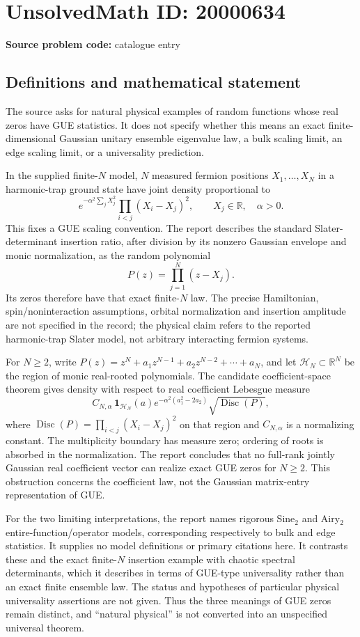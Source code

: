 \documentclass[11pt]{article}
\newcommand{\R}{\mathbb{R}}
\begin{document}
\section*{UnsolvedMath ID: 20000634}
\textbf{Source problem code:} catalogue entry
\subsection{Definitions and mathematical statement}
The source asks for natural physical examples of random functions whose real zeros have GUE statistics. It does not specify whether this means an exact finite-dimensional Gaussian unitary ensemble eigenvalue law, a bulk scaling limit, an edge scaling limit, or a universality prediction.

In the supplied finite-\(N\) model, \(N\) measured fermion positions \(X_1,\ldots,X_N\) in a harmonic-trap ground state have joint density proportional to
\[
 e^{-\alpha^2\sum_jX_j^2}\prod_{i<j}(X_i-X_j)^2,
 \qquad X_j\in\R,\quad\alpha>0.
\]
This fixes a GUE scaling convention. The report describes the standard Slater-determinant insertion ratio, after division by its nonzero Gaussian envelope and monic normalization, as the random polynomial
\[
 P(z)=\prod_{j=1}^N(z-X_j).
\]
Its zeros therefore have that exact finite-\(N\) law. The precise Hamiltonian, spin/noninteraction assumptions, orbital normalization and insertion amplitude are not specified in the record; the physical claim refers to the reported harmonic-trap Slater model, not arbitrary interacting fermion systems.

For \(N\ge2\), write \(P(z)=z^N+a_1z^{N-1}+a_2z^{N-2}+\cdots+a_N\), and let \(\mathcal H_N\subset\R^N\) be the region of monic real-rooted polynomials. The candidate coefficient-space theorem gives density with respect to real coefficient Lebesgue measure
\[
 C_{N,\alpha}\,\mathbf1_{\mathcal H_N}(a)
 e^{-\alpha^2(a_1^2-2a_2)}\sqrt{\operatorname{Disc}(P)},
\]
where \(\operatorname{Disc}(P)=\prod_{i<j}(X_i-X_j)^2\) on that region and \(C_{N,\alpha}\) is a normalizing constant. The multiplicity boundary has measure zero; ordering of roots is absorbed in the normalization. The report concludes that no full-rank jointly Gaussian real coefficient vector can realize exact GUE zeros for \(N\ge2\). This obstruction concerns the coefficient law, not the Gaussian matrix-entry representation of GUE.

For the two limiting interpretations, the report names rigorous Sine\(_2\) and Airy\(_2\) entire-function/operator models, corresponding respectively to bulk and edge statistics. It supplies no model definitions or primary citations here. It contrasts these and the exact finite-\(N\) insertion example with chaotic spectral determinants, which it describes in terms of GUE-type universality rather than an exact finite ensemble law. The status and hypotheses of particular physical universality assertions are not given. Thus the three meanings of GUE zeros remain distinct, and ``natural physical'' is not converted into an unspecified universal theorem.
\end{document}
